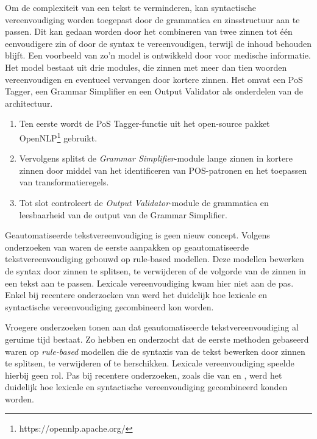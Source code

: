 
\medspace

Om de complexiteit van een tekst te verminderen, kan syntactische vereenvoudiging worden toegepast door de grammatica en zinsstructuur aan te passen. Dit kan gedaan worden door het combineren van twee zinnen tot één eenvoudigere zin of door de syntax te vereenvoudigen, terwijl de inhoud behouden blijft. Een voorbeeld van zo'n model is ontwikkeld door \textcite{Kandula2010} voor medische informatie. Het model bestaat uit drie modules, die zinnen met meer dan tien woorden vereenvoudigen en eventueel vervangen door kortere zinnen. Het omvat een PoS Tagger, een Grammar Simplifier en een Output Validator als onderdelen van de architectuur.

\medspace

\begin{enumerate}
	\item Ten eerste wordt de PoS Tagger-functie uit het open-source pakket OpenNLP\footnote{https://opennlp.apache.org/} gebruikt.
	\item Vervolgens splitst de \textit{Grammar Simplifier}-module lange zinnen in kortere zinnen door middel van het identificeren van POS-patronen en het toepassen van transformatieregels.
	\item Tot slot controleert de \textit{Output Validator}-module de grammatica en leesbaarheid van de output van de Grammar Simplifier.
\end{enumerate}  

\medspace

Geautomatiseerde tekstvereenvoudiging is geen nieuw concept. Volgens onderzoeken van \textcite{Canning2000, Siddharthan2006} waren de eerste aanpakken op geautomatiseerde tekstvereenvoudiging gebouwd op rule-based modellen. Deze modellen bewerken de syntax door zinnen te splitsen, te verwijderen of de volgorde van de zinnen in een tekst aan te passen. Lexicale vereenvoudiging kwam hier niet aan de pas. Enkel bij recentere onderzoeken van \textcite{Coster2011, Bulte2018} werd het duidelijk hoe lexicale en syntactische vereenvoudiging gecombineerd kon worden.

\medspace

Vroegere onderzoeken tonen aan dat geautomatiseerde tekstvereenvoudiging al geruime tijd bestaat. Zo hebben \textcite{Canning2000} en \textcite{Siddharthan2006} onderzocht dat de eerste methoden gebaseerd waren op \textit{rule-based} modellen die de syntaxis van de tekst bewerken door zinnen te splitsen, te verwijderen of te herschikken. Lexicale vereenvoudiging speelde hierbij geen rol. Pas bij recentere onderzoeken, zoals die van \textcite{Coster2011} en \textcite{Bulte2018}, werd het duidelijk hoe lexicale en syntactische vereenvoudiging gecombineerd konden worden.

